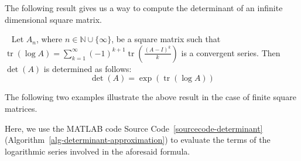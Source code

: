 \medskip

The following result gives us a way to compute the determinant of an infinite dimensional square matrix.

\begin{theorem}~\cite{amgopaper}\label{deteminant_of_an_infinite_matrix}
Let $A_{n}$, where $n\in \mathbb{N}\cup \{\infty\}$, be a square matrix such that $\operatorname{tr}(\log A) = \sum_{k=1}^{\infty} (-1)^{k+1}\operatorname{tr}(\frac{(A-I)^k}{k})$ is a convergent series. Then $\det(A)$ is determined as follows:
\[\det(A) = \exp(\operatorname{tr}(\log A))\]
\end{theorem}


The following two examples illustrate the above result in the case of finite square matrices. 

Here, we use the MATLAB code Source Code~\ref{sourcecode-determinant} (Algorithm~\ref{alg-determinant-approximation}) to evaluate the terms of the logarithmic series involved in the aforesaid formula. \newline



